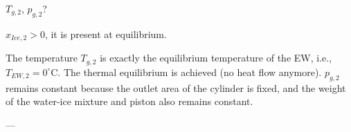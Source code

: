 \( T_{g,2} \), \( p_{g,2} \)?  

\( x_{Ice,2} > 0 \), it is present at equilibrium.  

The temperature \( T_{g,2} \) is exactly the equilibrium temperature of the EW, i.e., \( T_{EW,2} = 0^\circ \text{C} \). The thermal equilibrium is achieved (no heat flow anymore). \( p_{g,2} \) remains constant because the outlet area of the cylinder is fixed, and the weight of the water-ice mixture and piston also remains constant.  

---